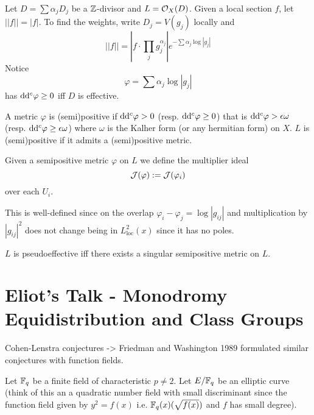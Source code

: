 \documentclass[12pt]{article}
\begin{document}
\begin{example}
Let $D = \sum \alpha_j D_j$ be a $\mathbb{Z}$-divisor and $L = \mathcal{O}_{X}(D)$. Given a local section $f$, let $|| f || = |f|$. To find the weights, write $D_j = V(g_j)$ locally and
\[ || f || = \left| f \cdot \prod_{j} g_j^{\alpha_j} \right| e^{- \sum \alpha_j \log{|g_j|}} \]
Notice 
\[ \varphi = \sum \alpha_j \log{|g_j|} \] 
has $\mathrm{d} \mathrm{d}^c \varphi \ge 0$ iff $D$ is effective.
\end{example}

\begin{defn}
A metric $\varphi$ is (semi)positive if $\mathrm{d} \mathrm{d}^c \varphi > 0$ (resp. $\mathrm{d} \mathrm{d}^c \varphi \ge 0$) that is $\mathrm{d} \mathrm{d}^c \varphi > \epsilon \omega$ (resp. $\mathrm{d} \mathrm{d}^c \varphi \ge \epsilon \omega$) where $\omega$ is the Kalher form (or any hermitian form) on $X$. $L$ is (semi)positive if it admits a (semi)positive metric. 
\end{defn}

\begin{defn}
Given a semipositive metric $\varphi$ on $L$ we define the multiplier ideal
\[ \mathcal{J}(\varphi) := \mathcal{J}(\varphi_i) \]
over each $U_i$. 
\end{defn}

\begin{rmk}
This is well-defined since on the overlap $\varphi_i - \varphi_j = \log{|g_{ij}|}$ and multiplication by $|g_{ij}|^2$ does not change being in $L^2_{\text{loc}}(x)$ since it has no poles.
\end{rmk}

\begin{theorem}[Demailly]
$L$ is pseudoeffective iff there exists a singular semipositive metric on $L$.
\end{theorem}


\section{Eliot's Talk - Monodromy Equidistribution and Class Groups}

\newcommand{\cM}{\mathcal{M}}

Cohen-Lenstra conjectures -> Friedman and Washington 1989 formulated similar conjectures with function fields. 
\par 
Let $\mathbb{F}_q$ be a finite field of characteristic $p \neq 2$. Let $E / \mathbb{F}_q$ be an elliptic curve (think of this an a quadratic number field with small discriminant since the function field given by $y^2 = f(x)$ i.e. $\mathbb{F}_q(x)(\sqrt{f(x)})$ and $f$ has small degree).
\end{document}
